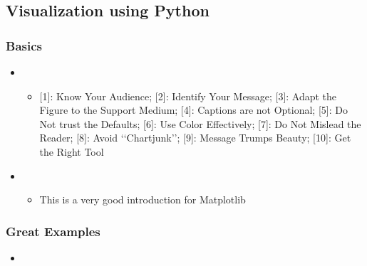 \documentclass[letterpaper,10pt,english]{sphinxmanual}
\begin{document}
\subsection{Visualization using Python}
\label{\detokenize{resource/programing/python_visualization:visualization-using-python}}\label{\detokenize{resource/programing/python_visualization::doc}}

\subsubsection{Basics}
\label{\detokenize{resource/programing/python_visualization:basics}}\begin{itemize}
\item {} 
\begin{itemize}
\item {} 
{[}1{]}: Know Your Audience; {[}2{]}: Identify Your Message; {[}3{]}: Adapt
the Figure to the Support Medium; {[}4{]}: Captions are not Optional;
{[}5{]}: Do Not trust the Defaults; {[}6{]}: Use Color Effectively; {[}7{]}:
Do Not Mislead the Reader; {[}8{]}: Avoid ‘‘Chartjunk’’; {[}9{]}: Message
Trumps Beauty; {[}10{]}: Get the Right Tool

\end{itemize}

\item {} 
\begin{itemize}
\item {} 
This is a very good introduction for Matplotlib

\end{itemize}

\end{itemize}


\subsubsection{Great Examples}
\label{\detokenize{resource/programing/python_visualization:great-examples}}\begin{itemize}
\item {} 

\end{itemize}
\end{document}
